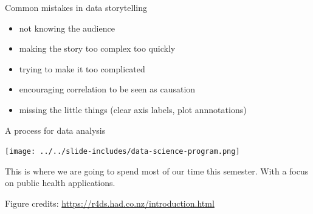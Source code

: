 \documentclass[table]{beamer}\usepackage[]{graphicx}\usepackage[]{color}
\begin{document}


\begin{frame}{Common mistakes in data storytelling}

\begin{itemize}
    \item not knowing the audience
    \item making the story too complex too quickly
    \item trying to make it too complicated
    \item encouraging correlation to be seen as causation
    \item missing the little things (clear axis labels, plot annnotations)
\end{itemize}

\end{frame}




\begin{frame}{A process for data analysis}

\texttt{[image: ../../slide-includes/data-science-program.png]}

\bigskip

This is where we are going to spend most of our time this semester. With a focus on public health applications.

\bigskip

 \tiny Figure credits: \url{https://r4ds.had.co.nz/introduction.html}

\end{frame}
\end{document}
